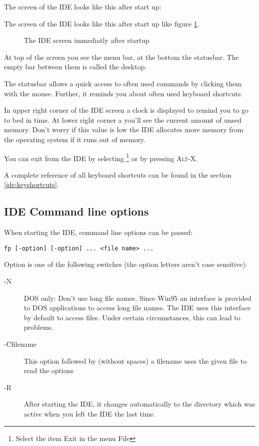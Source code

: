 \begin{htmlonly}
The screen of the IDE looks like this after start up:
\end{htmlonly}
\begin{latexonly}
The screen of the IDE looks like this after start up like figure \ref{fig:idestart}.
\begin{figure}
\caption{The IDE screen immediatly after startup}
\label{fig:idestart}
\ifpdf
{}
\else
{}
\fi
\end{figure}
\end{latexonly}
At top of the screen you see the menu bar, at the bottom the statusbar.
The empty bar between them is called the desktop.

The statusbar allows a quick access to often used commands by
clicking them with the mouse. Further, it reminds you about often used
keyboard shortcuts.

In upper right corner of the IDE screen a clock is displayed to
remind you to go to bed in time. At lower right corner a you'll
see the current amount of unsed memory. Don't worry if this value
is low the IDE allocates more memory from the operating system
if it runs out of memory.

You can exit from the IDE by selecting \footnote{Select
the item Exit in the menu File} or by pressing
\textsc{Alt-X}.

\begin{remark}
A complete reference of all keyboard shortcuts can be found in the
section \ref{ide:keyshortcuts}.
\end{remark}

\subsection{IDE Command line options}

When starting the IDE, command line options can be passed:
\begin{verbatim}
fp [-option] [-option] ... <file name> ...
\end{verbatim}

Option is one of the following switches (the option letters
aren't case sensitive):

\begin{description}
\item [-N] DOS only: Don't use long file names. Since Win95 an interface
is provided to DOS applications to access long file names. The IDE uses
this interface by default to access files. Under certain circumstances, this
can lead to problems.
\item [-Cfilename] This option followed by (without spaces)
a filename uses the given file to read the options
\item [-R] After starting the IDE, it changes automatically to the directory
which was active when you left the IDE the last time.
\end{description}

